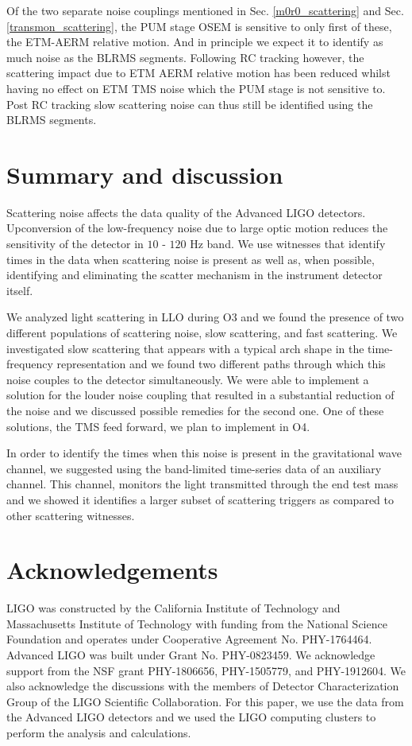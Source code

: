 \documentclass[12pt]{iopart}
\begin{document}
Of the two separate noise couplings mentioned in Sec. \ref{m0r0_scattering}  and Sec. \ref{transmon_scattering}, the PUM stage OSEM is sensitive to only first of these, the ETM-AERM relative motion. And in principle we expect it to identify as much noise as the BLRMS segments. Following RC tracking however, the scattering impact due to ETM AERM relative motion has been reduced whilst having no effect on ETM TMS noise which the PUM stage is not sensitive to. Post RC tracking slow scattering noise can thus still be identified using the BLRMS segments.



\newpage
\section{Summary and discussion}\label{summary}
 Scattering noise affects the data quality of the Advanced LIGO detectors. Upconversion of the low-frequency noise due to large optic motion reduces the sensitivity of the detector in $10$ - $120$ Hz band. We use witnesses that identify times in the data when scattering noise is present as well as, when possible, identifying and eliminating the scatter mechanism in the instrument detector itself. 

We analyzed light scattering in LLO during O3 and we found the presence of two different populations of scattering noise, slow scattering, and fast scattering. We investigated slow scattering that appears with a typical arch shape in the time-frequency representation and we found two different paths through which this noise couples to the detector simultaneously. We were able to implement a solution for the louder noise coupling that resulted in a substantial reduction of the noise and we discussed possible remedies for the second one. One of these solutions, the TMS feed forward, we plan to implement in O4.

In order to identify the times when this noise is present in the gravitational wave channel, we suggested using the band-limited time-series data of an auxiliary channel. This channel, monitors the light transmitted through the end test mass and we showed it identifies a larger subset of scattering triggers as compared to other scattering witnesses.
\par

\section{Acknowledgements} LIGO was constructed by the California Institute of Technology and Massachusetts Institute of Technology with funding from the National Science Foundation and operates under Cooperative Agreement No. PHY-1764464. Advanced LIGO was built under Grant No. PHY-0823459. We acknowledge support from the NSF grant PHY-1806656, PHY-1505779, and  PHY-1912604. We also acknowledge the discussions with the members of Detector Characterization Group of the LIGO Scientific Collaboration. For this paper, we use the data from the Advanced LIGO detectors and we used the LIGO computing clusters to perform the analysis and calculations.
\end{document}
